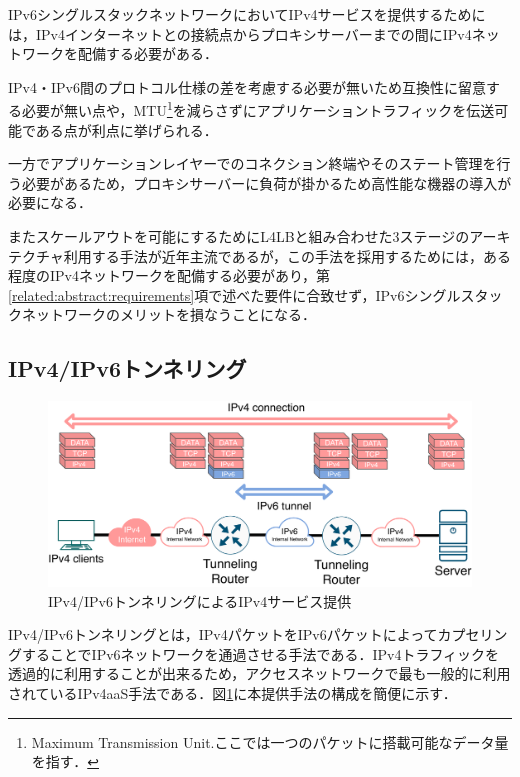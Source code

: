IPv6シングルスタックネットワークにおいてIPv4サービスを提供するためには，IPv4インターネットとの接続点からプロキシサーバーまでの間にIPv4ネットワークを配備する必要がある．

IPv4・IPv6間のプロトコル仕様の差を考慮する必要が無いため互換性に留意する必要が無い点や，MTU\footnote{Maximum Transmission Unit.ここでは一つのパケットに搭載可能なデータ量を指す．}を減らさずにアプリケーショントラフィックを伝送可能である点が利点に挙げられる．

一方でアプリケーションレイヤーでのコネクション終端やそのステート管理を行う必要があるため，プロキシサーバーに負荷が掛かるため高性能な機器の導入が必要になる．

またスケールアウトを可能にするためにL4LBと組み合わせた3ステージのアーキテクチャ利用する手法が近年主流である\cite{Facebook_LB, Google_LB}が，この手法を採用するためには，ある程度のIPv4ネットワークを配備する必要があり，第\ref{related:abstract:requirements}項で述べた要件に合致せず，IPv6シングルスタックネットワークのメリットを損なうことになる．



\subsection{IPv4/IPv6トンネリング}
\begin{figure}[h]
    \begin{center}
      \includegraphics[width=15cm,pagebox=cropbox,clip]{img/Tunneling_model.pdf}
    \end{center}
    \caption{IPv4/IPv6トンネリングによるIPv4サービス提供}
    \label{fig:tunneling_model}
\end{figure}

IPv4/IPv6トンネリングとは，IPv4パケットをIPv6パケットによってカプセリングすることでIPv6ネットワークを通過させる手法である．IPv4トラフィックを透過的に利用することが出来るため，アクセスネットワークで最も一般的に利用されているIPv4aaS手法である\cite{RFC8585}．図\ref{fig:tunneling_model}に本提供手法の構成を簡便に示す．

